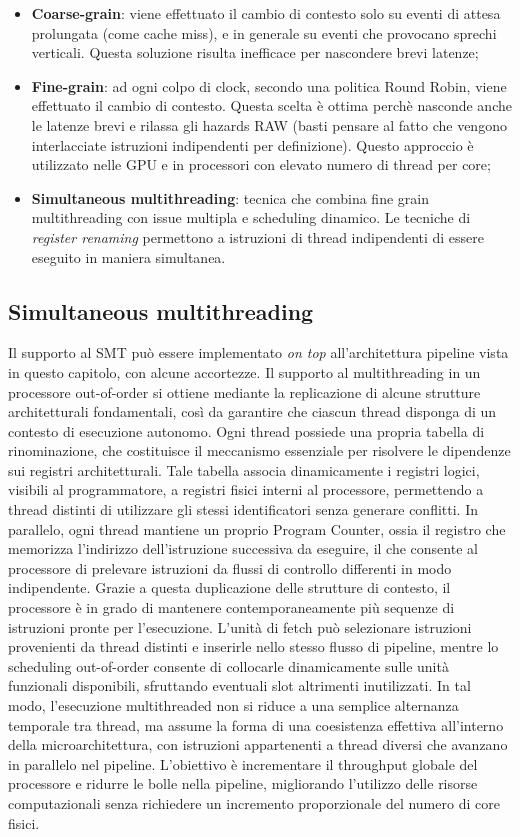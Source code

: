 \begin{itemize}
    \item \textbf{Coarse-grain}: viene effettuato il cambio di contesto solo su eventi di attesa prolungata (come cache miss), e in generale su eventi che provocano sprechi verticali. Questa soluzione risulta inefficace per nascondere brevi latenze;
    \item \textbf{Fine-grain}: ad ogni colpo di clock, secondo una politica Round Robin, viene effettuato il cambio di contesto. Questa scelta è ottima perchè nasconde anche le latenze brevi e rilassa gli hazards RAW (basti pensare al fatto che vengono interlacciate istruzioni indipendenti per definizione). Questo approccio è utilizzato nelle GPU e in processori con elevato numero di thread per core;
    \item \textbf{Simultaneous multithreading}: tecnica che combina fine grain multithreading con issue multipla e scheduling dinamico. Le tecniche di \textit{register renaming} permettono a istruzioni di thread indipendenti di essere eseguito in maniera simultanea. 
\end{itemize}

\subsection{Simultaneous multithreading}
Il supporto al SMT può essere implementato \textit{on top} all'architettura pipeline vista in questo capitolo, con alcune accortezze. 
Il supporto al multithreading in un processore out-of-order si ottiene mediante la replicazione di alcune strutture architetturali fondamentali, così da garantire che ciascun thread disponga di un contesto di esecuzione autonomo. Ogni thread possiede una propria tabella di rinominazione, che costituisce il meccanismo essenziale per risolvere le dipendenze sui registri architetturali. Tale tabella associa dinamicamente i registri logici, visibili al programmatore, a registri fisici interni al processore, permettendo a thread distinti di utilizzare gli stessi identificatori senza generare conflitti. In parallelo, ogni thread mantiene un proprio Program Counter, ossia il registro che memorizza l'indirizzo dell'istruzione successiva da eseguire, il che consente al processore di prelevare istruzioni da flussi di controllo differenti in modo indipendente.
Grazie a questa duplicazione delle strutture di contesto, il processore è in grado di mantenere contemporaneamente più sequenze di istruzioni pronte per l'esecuzione. L'unità di fetch può selezionare istruzioni provenienti da thread distinti e inserirle nello stesso flusso di pipeline, mentre lo scheduling out-of-order consente di collocarle dinamicamente sulle unità funzionali disponibili, sfruttando eventuali slot altrimenti inutilizzati. In tal modo, l'esecuzione multithreaded non si riduce a una semplice alternanza temporale tra thread, ma assume la forma di una coesistenza effettiva all'interno della microarchitettura, con istruzioni appartenenti a thread diversi che avanzano in parallelo nel pipeline. L'obiettivo è incrementare il throughput globale del processore e ridurre le bolle nella pipeline, migliorando l'utilizzo delle risorse computazionali senza richiedere un incremento proporzionale del numero di core fisici.

